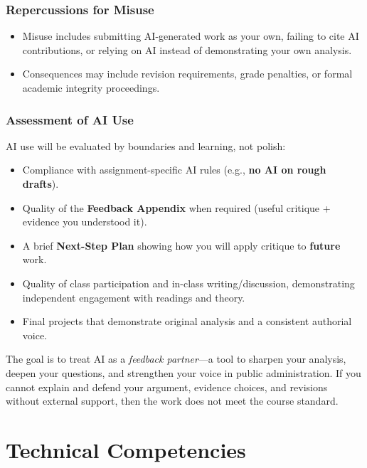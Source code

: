 \documentclass[11pt]{article}     %
\begin{document}
\subsubsection*{Repercussions for Misuse}

\begin{itemize}
    \item Misuse includes submitting AI-generated work as your own, failing to cite AI contributions, or relying on AI instead of demonstrating your own analysis.
    \item Consequences may include revision requirements, grade penalties, or formal academic integrity proceedings.
\end{itemize}

\subsubsection*{Assessment of AI Use}

AI use will be evaluated by boundaries and learning, not polish:

\begin{itemize}
    \item Compliance with assignment-specific AI rules (e.g., \textbf{no AI on rough drafts}).
    \item Quality of the \textbf{Feedback Appendix} when required (useful critique + evidence you understood it).
    \item A brief \textbf{Next-Step Plan} showing how you will apply critique to \textbf{future} work.
    \item Quality of class participation and in-class writing/discussion, demonstrating independent engagement with readings and theory.
    \item Final projects that demonstrate original analysis and a consistent authorial voice.
\end{itemize}

\noindent The goal is to treat AI as a \textit{feedback partner}---a tool to sharpen your analysis, deepen your questions, and strengthen your voice in public administration. If you cannot explain and defend your argument, evidence choices, and revisions without external support, then the work does not meet the course standard.

\section*{Technical Competencies}
\end{document}
